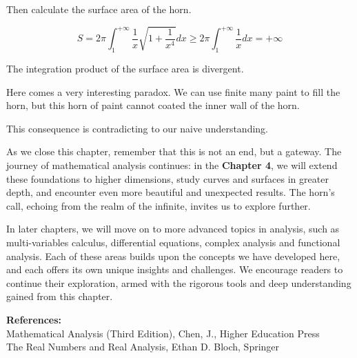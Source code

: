 \documentclass[oneside]{book}
\begin{document}
Then calculate the surface area of the horn.

\[
S = 2\pi \int_{1}^{+\infty} \frac{1}{x} \sqrt{1+\frac{1}{x^4}} dx \geq 2\pi \int_{1}^{+\infty} \frac{1}{x} dx = +\infty
\]

The integration product of the surface area is divergent.

Here comes a very interesting paradox. We can use finite many paint to fill the horn, but this horn of paint cannot coated the inner wall of the horn.

This consequence is contradicting to our naive understanding.

As we close this chapter, remember that this is not an end, but a gateway. The journey of mathematical analysis continues: in the \textbf{Chapter 4}, we will extend these foundations to higher dimensions, study curves and surfaces in greater depth, and encounter even more beautiful and unexpected results. The horn's call, echoing from the realm of the infinite, invites us to explore further.

In later chapters, we will move on to more advanced topics in analysis, such as multi-variables calculus, differential equations, complex analysis and functional analysis. Each of these areas builds upon the concepts we have developed here, and each offers its own unique insights and challenges. We encourage readers to continue their exploration, armed with the rigorous tools and deep understanding gained from this chapter.


\vspace{1cm}
\noindent
\textbf{References:} \\
Mathematical Analysis (Third Edition), Chen, J., Higher Education Press \\
The Real Numbers and Real Analysis, Ethan D. Bloch, Springer
\end{document}
